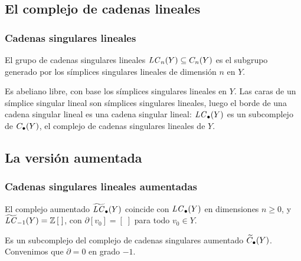 \subsection{El complejo de cadenas lineales}

\begin{frame}
  \frametitle{Cadenas singulares lineales}

  \begin{definition}
    El grupo de \alert{cadenas singulares lineales}
    $\mathit{LC}_n(Y)\subseteq C_n(Y)$ es el subgrupo generado por los
    símplices singulares lineales de dimensión $n$ en $Y$.
  \end{definition}

  \medskip

  Es abeliano libre, con base los símplices singulares lineales en $Y$.
  Las caras de un símplice singular lineal son símplices singulares
  lineales, luego el borde de una cadena singular lineal es una cadena singular
  lineal: $\mathit{LC}_\bullet(Y)$ es un subcomplejo de $C_\bullet(Y)$, el
  \alert{complejo de cadenas singulares lineales} de $Y$.
\end{frame}

\subsection{La versión aumentada}

\begin{frame}
  \frametitle{Cadenas singulares lineales aumentadas}

  \begin{definition}
    El complejo \alert{aumentado} $\widetilde{\mathit{LC}}_\bullet(Y)$ coincide con
    $\mathit{LC}_\bullet(Y)$ en dimensiones $n\geq0$, y
    $\widetilde{\mathit{LC}}_{-1}(Y)=\mathbb{Z}\,[\;]$, con
    $\partial[v_0]=[\;]$ para todo $v_0\in Y$.
  \end{definition}

  \medskip

  Es un subcomplejo del complejo de cadenas singulares aumentado
  $\widetilde{C}_\bullet(Y)$. Convenimos que $\partial=0$ en grado $-1$.
\end{frame}

